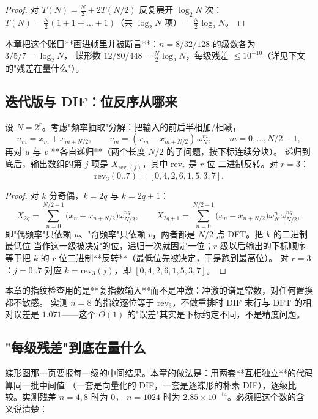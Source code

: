 \begin{proof}
对 $T(N)=\tfrac N2+2T(N/2)$ 反复展开 $\log_2N$ 次：
$T(N)=\tfrac N2(1+1+\dots+1)$（共 $\log_2N$ 项）$=\tfrac N2\log_2N$。
\end{proof}

本章把这个账目**画进帧里并被断言**：$n=8/32/128$ 的级数各为 $3/5/7=\log_2N$，
蝶形数 $12/80/448=\tfrac N2\log_2N$，每级残差 $\le10^{-10}$（详见下文的"残差在量什么"）。

\subsection{迭代版与 DIF：位反序从哪来}

\begin{theorem}
\label{thm:dif}
设 $N=2^r$。考虑"频率抽取"分解：把输入的前后半相加/相减，
\[
u_m=x_m+x_{m+N/2},\qquad v_m=(x_m-x_{m+N/2})\,\omega_N^m,\qquad m=0,\dots,N/2-1 ,
\]
再对 $u$ 与 $v$ **各自递归**（两个长度 $N/2$ 的子问题，按下标连续分块）。
递归到底后，输出数组的第 $j$ 项是 $X_{\mathrm{rev}_r(j)}$，其中 $\mathrm{rev}_r$ 是 $r$ 位
二进制反转。对 $r=3$：
\[
\mathrm{rev}_3(0..7)=[0,4,2,6,1,5,3,7].
\]
\end{theorem}

\begin{proof}
对 $k$ 分奇偶，$k=2q$ 与 $k=2q+1$：
\[
X_{2q}=\sum_{n=0}^{N/2-1}\bigl(x_n+x_{n+N/2}\bigr)\omega_{N/2}^{nq},\qquad
X_{2q+1}=\sum_{n=0}^{N/2-1}\bigl(x_n-x_{n+N/2}\bigr)\omega_N^n\,\omega_{N/2}^{nq},
\]
即"偶频率"只依赖 $u$、"奇频率"只依赖 $v$，两者都是 $N/2$ 点 DFT。把 $k$ 的二进制最低位
当作这一级被决定的位，递归一次就固定一位；$r$ 级以后输出的下标顺序等于把
$k$ 的 $r$ 位二进制**反转**（最低位先被决定，于是跑到最高位）。
对 $r=3$：$j=0..7$ 对应 $k=\mathrm{rev}_3(j)$，即 $[0,4,2,6,1,5,3,7]$。
\end{proof}

本章的指纹检查用的是**复指数输入**而不是冲激：冲激的谱是常数，对任何置换都不敏感。
实测 $n=8$ 的指纹逐位等于 $\mathrm{rev}_3$，不做重排时 DIF 末行与 DFT 的相对误差是
$1.071$——这个 $O(1)$ 的"误差"其实是下标约定不同，不是精度问题。

\subsection{"每级残差"到底在量什么}

蝶形图那一页要报每一级的中间结果。本章的做法是：用两套**互相独立**的代码算同一批中间值
（一套是向量化的 DIF，一套是逐蝶形的朴素 DIF），逐级比较。实测残差 $n=4,8$ 时为 $0$，
$n=1024$ 时为 $2.85\times10^{-14}$。必须把这个数的含义说清楚：

